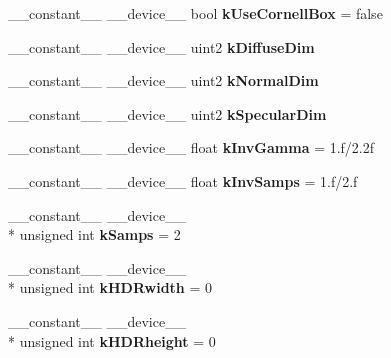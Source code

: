 \begin{DoxyCompactItemize}
\item 
\hypertarget{PathTracer_8cu_a404f8aee500bbfaf9fdde22334935ae5}{\-\_\-\-\_\-constant\-\_\-\-\_\- \-\_\-\-\_\-device\-\_\-\-\_\- bool {\bfseries k\-Use\-Cornell\-Box} = false}\label{PathTracer_8cu_a404f8aee500bbfaf9fdde22334935ae5}

\item 
\hypertarget{PathTracer_8cu_a5ffe23e61e0b0e291092031689bf723d}{\-\_\-\-\_\-constant\-\_\-\-\_\- \-\_\-\-\_\-device\-\_\-\-\_\- uint2 {\bfseries k\-Diffuse\-Dim}}\label{PathTracer_8cu_a5ffe23e61e0b0e291092031689bf723d}

\item 
\hypertarget{PathTracer_8cu_ad6f9887943280ba6afcc0a1c2718faca}{\-\_\-\-\_\-constant\-\_\-\-\_\- \-\_\-\-\_\-device\-\_\-\-\_\- uint2 {\bfseries k\-Normal\-Dim}}\label{PathTracer_8cu_ad6f9887943280ba6afcc0a1c2718faca}

\item 
\hypertarget{PathTracer_8cu_a339845c441b64bc83a2d6b8def41ac76}{\-\_\-\-\_\-constant\-\_\-\-\_\- \-\_\-\-\_\-device\-\_\-\-\_\- uint2 {\bfseries k\-Specular\-Dim}}\label{PathTracer_8cu_a339845c441b64bc83a2d6b8def41ac76}

\item 
\hypertarget{PathTracer_8cu_a9851c41ea272158daad1cf42b5f9594f}{\-\_\-\-\_\-constant\-\_\-\-\_\- \-\_\-\-\_\-device\-\_\-\-\_\- float {\bfseries k\-Inv\-Gamma} = 1.f/2.\-2f}\label{PathTracer_8cu_a9851c41ea272158daad1cf42b5f9594f}

\item 
\hypertarget{PathTracer_8cu_afd8a1c4b2c21deb46bdcbc77d8606ac0}{\-\_\-\-\_\-constant\-\_\-\-\_\- \-\_\-\-\_\-device\-\_\-\-\_\- float {\bfseries k\-Inv\-Samps} = 1.f/2.f}\label{PathTracer_8cu_afd8a1c4b2c21deb46bdcbc77d8606ac0}

\item 
\hypertarget{PathTracer_8cu_a5b6778486d807e8985816b9abc2a48a6}{\-\_\-\-\_\-constant\-\_\-\-\_\- \-\_\-\-\_\-device\-\_\-\-\_\- \\*
unsigned int {\bfseries k\-Samps} = 2}\label{PathTracer_8cu_a5b6778486d807e8985816b9abc2a48a6}

\item 
\hypertarget{PathTracer_8cu_a51c1ea8a638a21d49eae94a0090af5fb}{\-\_\-\-\_\-constant\-\_\-\-\_\- \-\_\-\-\_\-device\-\_\-\-\_\- \\*
unsigned int {\bfseries k\-H\-D\-Rwidth} = 0}\label{PathTracer_8cu_a51c1ea8a638a21d49eae94a0090af5fb}

\item 
\hypertarget{PathTracer_8cu_a8d48ccae760d1fdeac9587240813e5f7}{\-\_\-\-\_\-constant\-\_\-\-\_\- \-\_\-\-\_\-device\-\_\-\-\_\- \\*
unsigned int {\bfseries k\-H\-D\-Rheight} = 0}\label{PathTracer_8cu_a8d48ccae760d1fdeac9587240813e5f7}


\end{DoxyCompactItemize}
